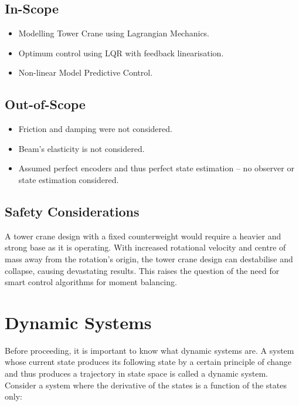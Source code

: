 \documentclass{UoNMCHA}
\numberwithin{equation}{section}
\begin{document}
	
	\newpage
	\subsection{In-Scope} \label{In-scope}
	
	\begin{itemize}
		\item Modelling Tower Crane using Lagrangian Mechanics.
		\item Optimum control using LQR with feedback linearisation.
		\item  Non-linear Model Predictive Control.
	\end{itemize}
	
	\subsection{Out-of-Scope} \label{Out-of-scope}
	
	\begin{itemize}
		\item Friction and damping were not considered.
		\item Beam's elasticity is not considered.
		\item Assumed perfect encoders and thus perfect state estimation – no observer or state estimation considered.
		
	\end{itemize}
	
	
	\subsection{Safety Considerations} \label{Safety Considerations}
	
	A tower crane design with a fixed counterweight would require a heavier and strong base as it is operating. With increased rotational velocity and centre of mass away from the rotation's origin, the tower crane design can destabilise and collapse, causing devastating results. This raises the question of the need for smart control algorithms for moment balancing.
	
	
	\section{Dynamic Systems}\label{Dynamic Systems}
	
	Before proceeding, it is important to know what dynamic systems are. A system whose current state produces its following state by a certain principle of change and thus produces a trajectory in state space is called a dynamic system. Consider a system where the derivative of the states is a function of the states only:
	
\end{document}
